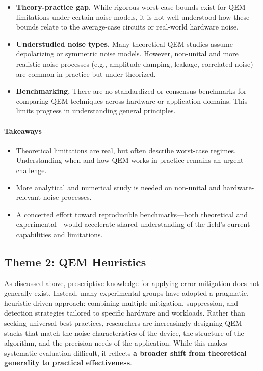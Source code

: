 \documentclass{article}
\begin{document}
\begin{itemize}
    \item \textbf{Theory-practice gap.} While rigorous worst-case bounds exist for QEM limitations under certain noise models, it is not well understood how these bounds relate to the average-case circuits or real-world hardware noise.
    
    \item \textbf{Understudied noise types.} Many theoretical QEM studies assume depolarizing or symmetric noise models. However, non-unital and more realistic noise processes (e.g., amplitude damping, leakage, correlated noise) are common in practice but under-theorized.
    
    \item \textbf{Benchmarking.} There are no standardized or consensus benchmarks for comparing QEM techniques across hardware or application domains. This limits progress in understanding general principles.
\end{itemize}

\paragraph{Takeaways}

\begin{itemize}
    \item Theoretical limitations are real, but often describe worst-case regimes. Understanding when and how QEM works in practice remains an urgent challenge.
    
    \item More analytical and numerical study is needed on non-unital and hardware-relevant noise processes.
    
    \item A concerted effort toward reproducible benchmarks—both theoretical and experimental—would accelerate shared understanding of the field’s current capabilities and limitations.
\end{itemize}


\subsection*{Theme 2: QEM Heuristics}

As discussed above, prescriptive knowledge for applying error mitigation does not generally exist.
Instead, many experimental groups have adopted a pragmatic, heuristic-driven approach: combining multiple mitigation, suppression, and detection strategies tailored to specific hardware and workloads.
Rather than seeking universal best practices, researchers are increasingly designing QEM stacks that match the noise characteristics of the device, the structure of the algorithm, and the precision needs of the application.
While this makes systematic evaluation difficult, it reflects \textbf{a broader shift from theoretical generality to practical effectiveness}.
\end{document}
